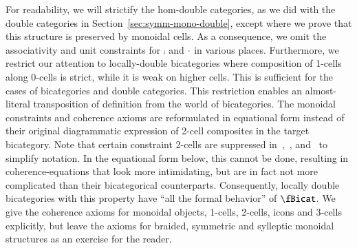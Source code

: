For readability, we will strictify the hom-double categories, as we did with the double categories in Section~\ref{sec:symm-mono-double}, except where we prove that this structure is preserved by monoidal cells. As a consequence, we omit the associativity and unit constraints for $\comp$ and $\cdot$ in various places.
Furthermore, we restrict our attention to locally-double bicategories where composition of 1-cells along 0-cells is strict, while it is weak on higher cells. This is sufficient for the cases of bicategories and double categories. This restriction enables an almost-literal transposition of definition from the world of bicategories. The monoidal constraints and coherence axioms are reformulated in equational form instead of their original diagrammatic expression of 2-cell composites in the target bicategory. Note that certain constraint 2-cells are suppressed in~\cite{nick:tricatsbook},~\cite{mccrudden:bal-coalgb}, and~\cite{gg:ldstr-tricat} to simplify notation. In the equational form below, this cannot be done, resulting in coherence-equations that look more intimidating, but are in fact not more complicated than their bicategorical counterparts. Consequently, locally double bicategories with this property have ``all the formal behavior'' of $\fBicat$.
We give the coherence axioms for monoidal objects, 1-cells, 2-cells, icons and 3-cells explicitly, but leave the axioms for braided, symmetric and sylleptic monoidal structures as an exercise for the reader.

